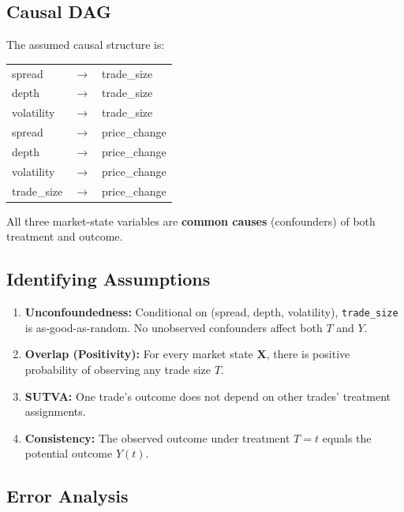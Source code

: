 \documentclass[11pt, letterpaper]{article}
\begin{document}
\subsection{Causal DAG}

The assumed causal structure is:

\begin{center}
\begin{tabular}{lcl}
    spread      & $\longrightarrow$ & trade\_size \\
    depth       & $\longrightarrow$ & trade\_size \\
    volatility  & $\longrightarrow$ & trade\_size \\[4pt]
    spread      & $\longrightarrow$ & price\_change \\
    depth       & $\longrightarrow$ & price\_change \\
    volatility  & $\longrightarrow$ & price\_change \\
    trade\_size & $\longrightarrow$ & price\_change \\
\end{tabular}
\end{center}

\noindent All three market-state variables are \textbf{common causes} (confounders) of both treatment and outcome.

\subsection{Identifying Assumptions}

\begin{enumerate}[leftmargin=2em]
    \item \textbf{Unconfoundedness:} Conditional on (spread, depth, volatility), \texttt{trade\_size} is as-good-as-random. No unobserved confounders affect both $T$ and $Y$.
    \item \textbf{Overlap (Positivity):} For every market state $\mathbf{X}$, there is positive probability of observing any trade size $T$.
    \item \textbf{SUTVA:} One trade's outcome does not depend on other trades' treatment assignments.
    \item \textbf{Consistency:} The observed outcome under treatment $T = t$ equals the potential outcome $Y(t)$.
\end{enumerate}

\subsection{Error Analysis}
\end{document}
